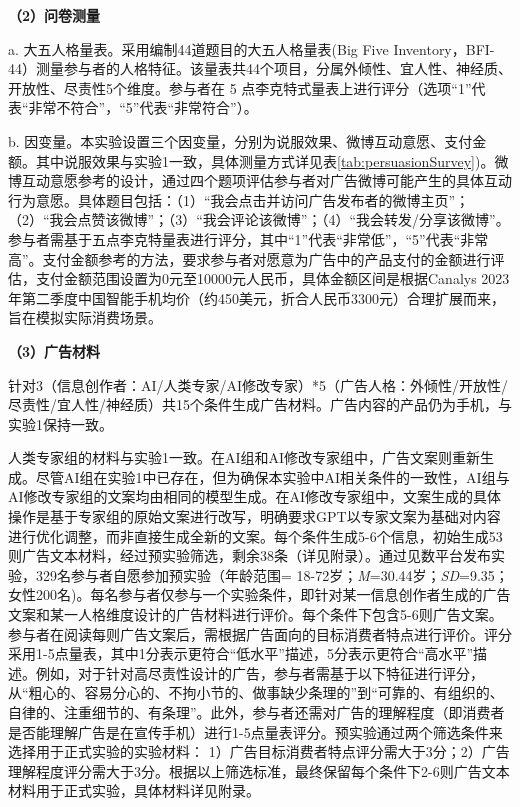 \textbf{（2）问卷测量}

a. 大五人格量表。采用\citet{john1991big}编制44道题目的大五人格量表(Big Five Inventory，BFI-44）测量参与者的人格特征。该量表共44个项目，分属外倾性、宜人性、神经质、开放性、尽责性5个维度。参与者在 5 点李克特式量表上进行评分（选项“1”代表“非常不符合”，“5”代表“非常符合”）。

b. 因变量。本实验设置三个因变量，分别为说服效果、微博互动意愿、支付金额。其中说服效果与实验1一致，具体测量方式详见表\ref{tab:persuasionSurvey})。微博互动意愿参考\citet{winter2021effects}的设计，通过四个题项评估参与者对广告微博可能产生的具体互动行为意愿。具体题目包括：（1）“我会点击并访问广告发布者的微博主页”；（2）“我会点赞该微博”；（3）“我会评论该微博”；（4）“我会转发/分享该微博”。参与者需基于五点李克特量表进行评分，其中“1”代表“非常低”，“5”代表“非常高”。支付金额参考\citet{matz2024potential}的方法，要求参与者对愿意为广告中的产品支付的金额进行评估，支付金额范围设置为0元至10000元人民币，具体金额区间是根据Canalys 2023年第二季度中国智能手机均价（约450美元，折合人民币3300元）合理扩展而来，旨在模拟实际消费场景。

\textbf{（3）广告材料}

针对3（信息创作者：AI/人类专家/AI修改专家）*5（广告人格：外倾性/开放性/尽责性/宜人性/神经质）共15个条件生成广告材料。广告内容的产品仍为手机，与实验1保持一致。

人类专家组的材料与实验1一致。在AI组和AI修改专家组中，广告文案则重新生成。尽管AI组在实验1中已存在，但为确保本实验中AI相关条件的一致性，AI组与AI修改专家组的文案均由相同的模型生成。在AI修改专家组中，文案生成的具体操作是基于专家组的原始文案进行改写，明确要求GPT以专家文案为基础对内容进行优化调整，而非直接生成全新的文案。每个条件生成5-6个信息，初始生成53则广告文本材料，经过预实验筛选，剩余38条（详见附录）。通过见数平台发布实验，329名参与者自愿参加预实验（年龄范围= 18-72岁；\textit{M}=30.44岁；\textit{SD}=9.35；女性200名)。每名参与者仅参与一个实验条件，即针对某一信息创作者生成的广告文案和某一人格维度设计的广告材料进行评价。每个条件下包含5-6则广告文案。参与者在阅读每则广告文案后，需根据广告面向的目标消费者特点进行评价。评分采用1-5点量表，其中1分表示更符合“低水平”描述，5分表示更符合“高水平”描述。例如，对于针对高尽责性设计的广告，参与者需基于以下特征进行评分，从“粗心的、容易分心的、不拘小节的、做事缺少条理的”到“可靠的、有组织的、自律的、注重细节的、有条理”。此外，参与者还需对广告的理解程度（即消费者是否能理解广告是在宣传手机）进行1-5点量表评分。预实验通过两个筛选条件来选择用于正式实验的实验材料： 1）广告目标消费者特点评分需大于3分；2）广告理解程度评分需大于3分。根据以上筛选标准，最终保留每个条件下2-6则广告文本材料用于正式实验，具体材料详见附录。

